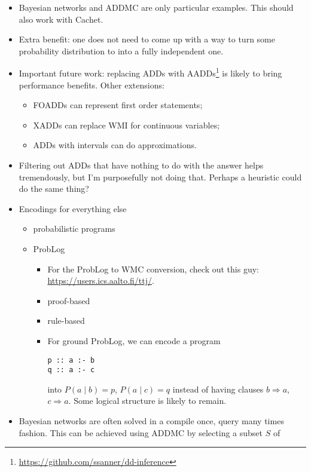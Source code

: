 \documentclass{article}
\theoremstyle{definition}
\theoremstyle{remark}
\begin{document}
\begin{itemize}
\item Bayesian networks and ADDMC are only particular examples. This should also
  work with Cachet.
\item Extra benefit: one does not need to come up with a way to turn some
  probability distribution to into a fully independent one.
\item Important future work: replacing ADDs with
  AADDs\footnote{\url{https://github.com/ssanner/dd-inference}}
  \cite{DBLP:conf/ijcai/SannerM05} is likely to bring performance benefits.
  Other extensions:
  \begin{itemize}
  \item FOADDs can represent first order statements;
  \item XADDs can replace WMI for continuous variables;
  \item ADDs with intervals can do approximations.
  \end{itemize}
\item Filtering out ADDs that have nothing to do with the answer helps
  tremendously, but I'm purposefully not doing that. Perhaps a heuristic could
  do the same thing?
\item Encodings for everything else
  \begin{itemize}
  \item probabilistic programs \cite{DBLP:journals/corr/abs-2005-09089}
  \item ProbLog \cite{DBLP:conf/uai/FierensBTGR11}
    \begin{itemize}
    \item For the ProbLog to WMC conversion, check out this guy:
      \url{https://users.ics.aalto.fi/ttj/}.
    \item proof-based \cite{DBLP:conf/iclp/MantadelisJ10}
    \item rule-based \cite{DBLP:conf/ecai/Janhunen04}
    \item For ground ProbLog, we can encode a program
\begin{verbatim}
p :: a :- b
q :: a :- c
\end{verbatim}
      into $P(a \mid b)=p$, $P(a \mid c)=q$ instead of having clauses $b
      \Rightarrow a$, $c \Rightarrow a$. Some logical structure is likely to
      remain.
    \end{itemize}
  \end{itemize}
\item Bayesian networks are often solved in a compile once, query many times
  fashion. This can be achieved using ADDMC by selecting a subset $S$ of

\end{itemize}
\end{document}
